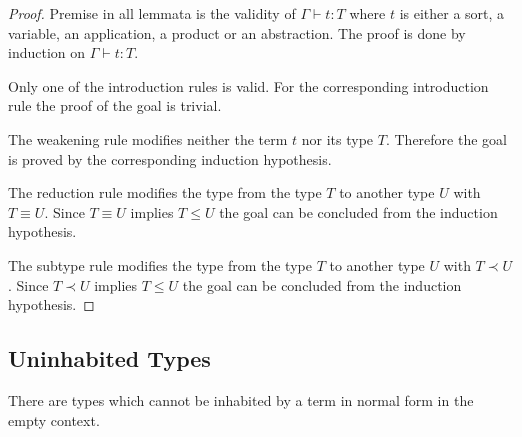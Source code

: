 \begin{theorem}
    \begin{proof}
        Premise in all lemmata is the validity of $\Gamma \vdash t: T$ where $t$
        is either a sort, a variable, an application, a product or an
        abstraction. The proof is done by induction on $\Gamma \vdash t: T$.

        Only one of the introduction rules is valid. For the corresponding
        introduction rule the proof of the goal is trivial.

        The weakening rule modifies neither the term $t$ nor its type $T$.
        Therefore the goal is proved by the corresponding induction hypothesis.

        The reduction rule modifies the type from the type $T$ to another type
        $U$ with $T \equiv U$. Since $T \equiv U$ implies $T \le U$ the goal can
        be concluded from the induction hypothesis.

        The subtype rule modifies the type from the type $T$ to another type $U$
        with $T \prec U$. Since $T \prec U$ implies $T \le U$ the goal can be
        concluded from the induction hypothesis.
    \end{proof}
\end{theorem}



\subsection{Uninhabited Types}



There are types which cannot be inhabited by a term in normal form in the empty
context.


